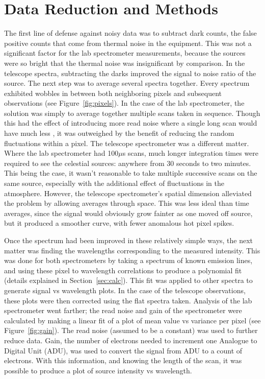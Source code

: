 \documentclass[a4paper,12pt]{article}
\begin{document}
\section{Data Reduction and Methods}
\label{data}
The first line of defense against noisy data was to subtract dark counts, the false positive counts that come from thermal noise in the equipment. This was not a significant factor for the lab spectrometer measurements, because the sources were so bright that the thermal noise was insignificant by comparison. In the telescope spectra, subtracting the darks improved the signal to noise ratio of the source. The next step was to average several spectra together. Every spectrum exhibited wobbles in between both neighboring pixels and subsequent observations (see Figure~\ref{fig:pixels}). In the case of the lab spectrometer, the solution was simply to average together multiple scans taken in sequence. Though this had the effect of introducing more read noise where a single long scan would have much less \citep{ccd}, it was outweighed by the benefit of reducing the random fluctuations within a pixel. The telescope spectrometer was a different matter. Where the lab spectrometer had 100$\mu$s scans, much longer integration times were required to see the celestial sources: anywhere from 30 seconds to two minutes. This being the case, it wasn’t reasonable to take multiple successive scans on the same source, especially with the additional effect of fluctuations in the atmosphere. However, the telescope spectrometer's spatial dimension alleviated the problem by allowing averages through space. This was less ideal than time averages, since the signal would obviously grow fainter as one moved off source, but it produced a smoother curve, with fewer anomalous hot pixel spikes.

Once the spectrum had been improved in these relatively simple ways, the next matter was finding the wavelengths corresponding to the measured intensity. This was done for both spectrometers by taking a spectrum of known emission lines, and using these pixel to wavelength correlations to produce a polynomial fit (details explained in Section~\ref{sec:calc}). This fit was applied to other spectra to generate signal vs wavelength plots. In the case of the telescope observations, these plots were then corrected using the flat spectra taken. Analysis of the lab spectrometer went farther; the read noise and gain of the spectrometer were calculated by making a linear fit of a plot of mean value vs variance per pixel (see Figure~\ref{fig:gain}). The read noise (assumed to be a constant) was used to further reduce data. Gain, the number of electrons needed to increment one Analogue to Digital Unit (ADU), was used to convert the signal from ADU to a count of electrons. With this information, and knowing the length of the scan, it was possible to produce a plot of source intensity vs wavelength.
\end{document}
